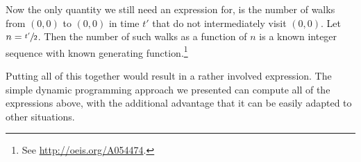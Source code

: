 \documentclass[11pt,a4paper,twoside,british]{article}
\begin{document}
Now the only quantity we still need an expression for, is the number of walks
from $(0, 0)$ to $(0, 0)$ in time $t'$ that do not intermediately visit
$(0, 0)$.
Let $n = \sfrac{t'}{2}$.
Then the number of such walks as a function of $n$ is a known integer sequence
with known generating function.\footnote{See \url{http://oeis.org/A054474}.}

Putting all of this together would result in a rather involved expression.
The simple dynamic programming approach we presented can compute all of the
expressions above, with the additional advantage that it can be easily adapted
to other situations.
\end{document}

